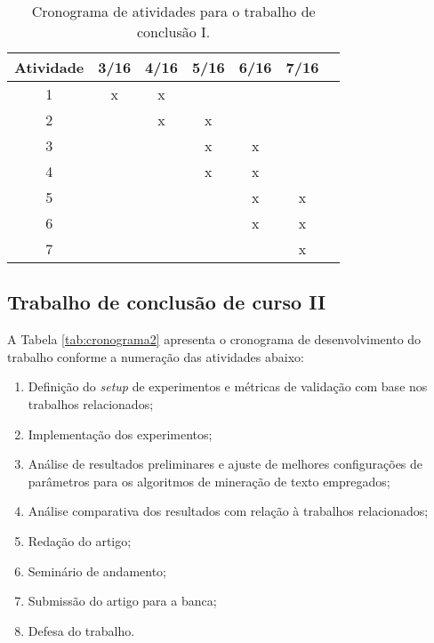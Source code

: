 \documentclass[11pt,a4paper]{article}
\begin{document}
\begin{table}[h]
  \begin{center}
    \caption{Cronograma de atividades para o trabalho de conclusão I. \label{tab:cronograma1}}
    \begin{tabular}{|c|c|c|c|c|c|c|}
      \hline
      \bf Atividade & \bf 3/16 & \bf 4/16 & \bf 5/16 & \bf 6/16 & \bf 7/16 \\  \hline \hline
      1 & x & x &   &   &   \\ \hline
      2 &   & x & x &   &   \\ \hline
      3 &   &   & x & x &   \\ \hline
      4 &   &   & x & x &   \\ \hline
      5 &   &   &   & x & x \\ \hline
      6 &   &   &   & x & x \\ \hline
      7 &   &   &   &   & x \\ \hline
    \end{tabular}
  \end{center}
\end{table}

\subsection{Trabalho de conclusão de curso II}

A Tabela \ref{tab:cronograma2} apresenta o cronograma de desenvolvimento do trabalho conforme a numeração das atividades abaixo:
\begin{enumerate}
  \item Definição do \textit{setup} de experimentos e métricas de validação com base nos trabalhos relacionados;
  \item Implementação dos experimentos;
  \item Análise de resultados preliminares e ajuste de melhores configurações de parâmetros para os algoritmos de mineração de texto empregados;
  \item Análise comparativa dos resultados com relação à trabalhos relacionados;
  \item Redação do artigo;
  \item Seminário de andamento;
  \item Submissão do artigo para a banca;
  \item Defesa do trabalho.
\end{enumerate}
\end{document}
